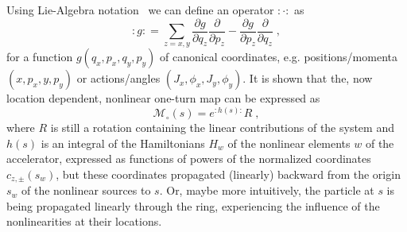 Using Lie-Algebra notation~\cite{DragtLieSeriesInvariant1976, DragtLieAlgebraicTheory1982} we can define an operator $:\cdot:$ as
%
\begin{equation}
    \label{eq:LieOperator}
    :g: = \sum\limits_{z=x,y} \frac{\partial g}{\partial q_z} \frac{\partial }{\partial p_z} - \frac{\partial g}{\partial p_z} \frac{\partial }{\partial q_z} \;,
\end{equation}
%
for a function $g(q_x, p_x, q_y, p_y)$ of canonical coordinates, e.g. positions/momenta $\left( x, p_x, y, p_y \right)$ or actions/angles $\left( J_x, \phi_x, J_y, \phi_y\right)$.
It is shown that the, now location dependent, nonlinear one-turn map can be expressed as
\begin{equation}
    \label{eq:OTMNormalized}
    \mathcal{M}_\circ(s) = e^{:h(s):}R  \; ,
\end{equation}
%
where $R$ is still a rotation containing the linear contributions of the system and $h(s)$
is an integral of the Hamiltonians $H_w$ of the nonlinear elements $w$ of the accelerator,
expressed as functions of powers of the normalized coordinates $c_{z, \pm}(s_w)$, 
but these coordinates propagated (linearly) backward from the origin $s_w$ of the nonlinear sources to $s$.
Or, maybe more intuitively, the particle at $s$ is being propagated linearly through the ring, 
experiencing the influence of the nonlinearities at their locations. 

